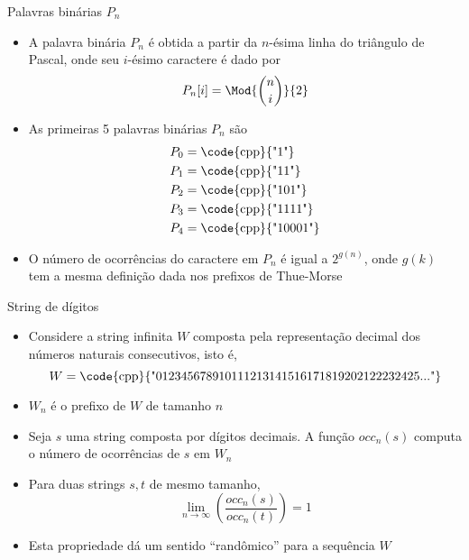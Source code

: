 \begin{frame}[fragile]{Palavras binárias $P_n$}

    \begin{itemize}
        \item A palavra binária $P_n$ é obtida a partir da $n$-ésima linha do triângulo de Pascal, 
            onde seu $i$-ésimo caractere é dado por 
            \[
                P_n[i] = \Mod{\binom{n}{i}}{2}
            \]
        \pause

        \item As primeiras 5 palavras binárias $P_n$ são
        \begin{align*}
            P_0 &= \mbox{\code{cpp}{"1"}} \\
            P_1 &= \mbox{\code{cpp}{"11"}} \\
            P_2 &= \mbox{\code{cpp}{"101"}} \\
            P_3 &= \mbox{\code{cpp}{"1111"}} \\
            P_4 &= \mbox{\code{cpp}{"10001"}}
        \end{align*}
        \pause

        \item O número de ocorrências do caractere  em $P_n$ é igual a $2^{g(n)}$, onde 
            $g(k)$ tem a mesma definição dada nos prefixos de Thue-Morse
    \end{itemize}

\end{frame}

\begin{frame}[fragile]{String de dígitos}

    \begin{itemize}
        \item Considere a string infinita $W$ composta pela representação decimal dos números 
            naturais consecutivos, isto é,
        \[
            W = \mbox{\code{cpp}{"012345678910111213141516171819202122232425..."}}
        \]
        \pause

        \item $W_n$ é o prefixo de $W$ de tamanho $n$
        \pause

        \item Seja $s$ uma string composta por dígitos decimais. A função $occ_n(s)$ computa o 
            número de ocorrências de $s$ em $W_n$
        \pause

        \item Para duas strings $s, t$ de mesmo tamanho, 
        \[
            \lim_{n\to\infty} \left(\frac{occ_n(s)}{occ_n(t)}\right) = 1
        \]
        \pause

        \item Esta propriedade dá um sentido ``randômico'' para a sequência $W$
    \end{itemize}

\end{frame}


